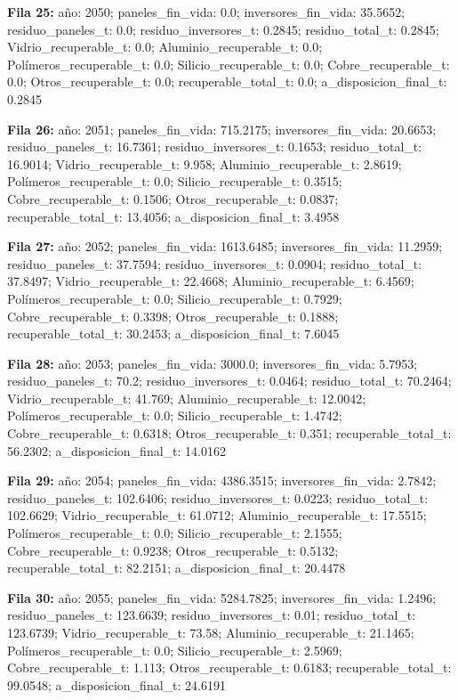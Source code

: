 {\footnotesize\textbf{Fila 25:} año: 2050; paneles\_fin\_vida: 0.0; inversores\_fin\_vida: 35.5652; residuo\_paneles\_t: 0.0; residuo\_inversores\_t: 0.2845; residuo\_total\_t: 0.2845; Vidrio\_recuperable\_t: 0.0; Aluminio\_recuperable\_t: 0.0; Polímeros\_recuperable\_t: 0.0; Silicio\_recuperable\_t: 0.0; Cobre\_recuperable\_t: 0.0; Otros\_recuperable\_t: 0.0; recuperable\_total\_t: 0.0; a\_disposicion\_final\_t: 0.2845\par}
{\footnotesize\textbf{Fila 26:} año: 2051; paneles\_fin\_vida: 715.2175; inversores\_fin\_vida: 20.6653; residuo\_paneles\_t: 16.7361; residuo\_inversores\_t: 0.1653; residuo\_total\_t: 16.9014; Vidrio\_recuperable\_t: 9.958; Aluminio\_recuperable\_t: 2.8619; Polímeros\_recuperable\_t: 0.0; Silicio\_recuperable\_t: 0.3515; Cobre\_recuperable\_t: 0.1506; Otros\_recuperable\_t: 0.0837; recuperable\_total\_t: 13.4056; a\_disposicion\_final\_t: 3.4958\par}
{\footnotesize\textbf{Fila 27:} año: 2052; paneles\_fin\_vida: 1613.6485; inversores\_fin\_vida: 11.2959; residuo\_paneles\_t: 37.7594; residuo\_inversores\_t: 0.0904; residuo\_total\_t: 37.8497; Vidrio\_recuperable\_t: 22.4668; Aluminio\_recuperable\_t: 6.4569; Polímeros\_recuperable\_t: 0.0; Silicio\_recuperable\_t: 0.7929; Cobre\_recuperable\_t: 0.3398; Otros\_recuperable\_t: 0.1888; recuperable\_total\_t: 30.2453; a\_disposicion\_final\_t: 7.6045\par}
{\footnotesize\textbf{Fila 28:} año: 2053; paneles\_fin\_vida: 3000.0; inversores\_fin\_vida: 5.7953; residuo\_paneles\_t: 70.2; residuo\_inversores\_t: 0.0464; residuo\_total\_t: 70.2464; Vidrio\_recuperable\_t: 41.769; Aluminio\_recuperable\_t: 12.0042; Polímeros\_recuperable\_t: 0.0; Silicio\_recuperable\_t: 1.4742; Cobre\_recuperable\_t: 0.6318; Otros\_recuperable\_t: 0.351; recuperable\_total\_t: 56.2302; a\_disposicion\_final\_t: 14.0162\par}
{\footnotesize\textbf{Fila 29:} año: 2054; paneles\_fin\_vida: 4386.3515; inversores\_fin\_vida: 2.7842; residuo\_paneles\_t: 102.6406; residuo\_inversores\_t: 0.0223; residuo\_total\_t: 102.6629; Vidrio\_recuperable\_t: 61.0712; Aluminio\_recuperable\_t: 17.5515; Polímeros\_recuperable\_t: 0.0; Silicio\_recuperable\_t: 2.1555; Cobre\_recuperable\_t: 0.9238; Otros\_recuperable\_t: 0.5132; recuperable\_total\_t: 82.2151; a\_disposicion\_final\_t: 20.4478\par}
{\footnotesize\textbf{Fila 30:} año: 2055; paneles\_fin\_vida: 5284.7825; inversores\_fin\_vida: 1.2496; residuo\_paneles\_t: 123.6639; residuo\_inversores\_t: 0.01; residuo\_total\_t: 123.6739; Vidrio\_recuperable\_t: 73.58; Aluminio\_recuperable\_t: 21.1465; Polímeros\_recuperable\_t: 0.0; Silicio\_recuperable\_t: 2.5969; Cobre\_recuperable\_t: 1.113; Otros\_recuperable\_t: 0.6183; recuperable\_total\_t: 99.0548; a\_disposicion\_final\_t: 24.6191\par}
